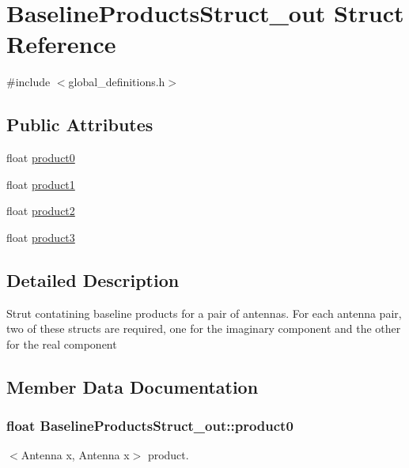 \hypertarget{struct_baseline_products_struct__out}{}\section{Baseline\+Products\+Struct\+\_\+out Struct Reference}
\label{struct_baseline_products_struct__out}


{\ttfamily \#include $<$global\+\_\+definitions.\+h$>$}

\subsection*{Public Attributes}
\begin{DoxyCompactItemize}
\item 
float \hyperlink{struct_baseline_products_struct__out_adcfed0475c13ccdcaf398160c9827edf}{product0}
\item 
float \hyperlink{struct_baseline_products_struct__out_a35670336bbaf3d077c55f9550f4b895c}{product1}
\item 
float \hyperlink{struct_baseline_products_struct__out_a4cd6dd3eea5e3c23ab91847dc9d30922}{product2}
\item 
float \hyperlink{struct_baseline_products_struct__out_a3bbe18fde5c12745f9814333c3bb4c3f}{product3}
\end{DoxyCompactItemize}


\subsection{Detailed Description}
Strut contatining baseline products for a pair of antennas. For each antenna pair, two of these structs are required, one for the imaginary component and the other for the real component 

\subsection{Member Data Documentation}
\subsubsection[{\texorpdfstring{product0}{product0}}]{\setlength{\rightskip}{0pt plus 5cm}float Baseline\+Products\+Struct\+\_\+out\+::product0}\hypertarget{struct_baseline_products_struct__out_adcfed0475c13ccdcaf398160c9827edf}{}\label{struct_baseline_products_struct__out_adcfed0475c13ccdcaf398160c9827edf}
$<$Antenna x, Antenna x$>$ product. 
